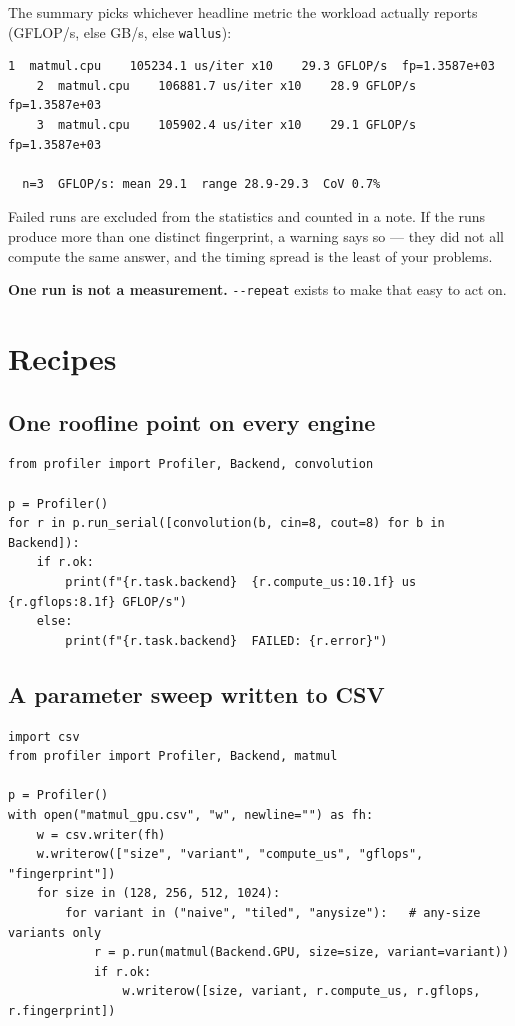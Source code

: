 \documentclass[11pt,a4paper]{article}
\newcommand{\code}[1]{\texttt{\let\_\breakableunderscore #1}}
\newcommand{\breakableunderscore}{\textunderscore\allowbreak}
\begin{document}
The summary picks whichever headline metric the workload actually reports
(GFLOP/s, else GB/s, else \code{wall\_us}):

\begin{lstlisting}[style=plain]
    1  matmul.cpu    105234.1 us/iter x10    29.3 GFLOP/s  fp=1.3587e+03
    2  matmul.cpu    106881.7 us/iter x10    28.9 GFLOP/s  fp=1.3587e+03
    3  matmul.cpu    105902.4 us/iter x10    29.1 GFLOP/s  fp=1.3587e+03

  n=3  GFLOP/s: mean 29.1  range 28.9-29.3  CoV 0.7%
\end{lstlisting}

\noindent Failed runs are excluded from the statistics and counted in a note.
If the runs produce more than one distinct fingerprint, a warning says so ---
they did not all compute the same answer, and the timing spread is the least of
your problems.

\noindent \textbf{One run is not a measurement.} \code{-{}-repeat} exists to
make that easy to act on.

\section{Recipes}

\subsection{One roofline point on every engine}

\begin{lstlisting}
from profiler import Profiler, Backend, convolution

p = Profiler()
for r in p.run_serial([convolution(b, cin=8, cout=8) for b in Backend]):
    if r.ok:
        print(f"{r.task.backend}  {r.compute_us:10.1f} us  {r.gflops:8.1f} GFLOP/s")
    else:
        print(f"{r.task.backend}  FAILED: {r.error}")
\end{lstlisting}

\subsection{A parameter sweep written to CSV}

\begin{lstlisting}
import csv
from profiler import Profiler, Backend, matmul

p = Profiler()
with open("matmul_gpu.csv", "w", newline="") as fh:
    w = csv.writer(fh)
    w.writerow(["size", "variant", "compute_us", "gflops", "fingerprint"])
    for size in (128, 256, 512, 1024):
        for variant in ("naive", "tiled", "anysize"):   # any-size variants only
            r = p.run(matmul(Backend.GPU, size=size, variant=variant))
            if r.ok:
                w.writerow([size, variant, r.compute_us, r.gflops, r.fingerprint])
\end{lstlisting}
\end{document}
